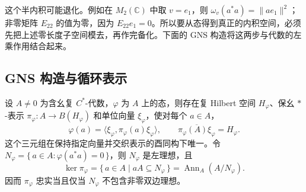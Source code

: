 \ProseParagraphBreak
这个半内积可能退化。例如在 \(M_2(\mathbb C)\) 中取 \(v=e_1\)，则 \(\omega_v(a^*a)=\|ae_1\|^2\)；非零矩阵 \(E_{22}\) 的值为零，因为 \(E_{22}e_1=0\)。所以要从态得到真正的内积空间，必须先把上述零长度子空间模去，再作完备化。下面的 GNS 构造将这两步与代数的左乘作用结合起来。

\subsection{GNS 构造与循环表示}
\label{b2:subsec:D03:02}

\begin{theorem}\label{b2:thm:gns-unital}
	设 \(A\ne0\) 为含幺复 \(C^*\)-代数，\(\varphi\) 为 \(A\) 上的态，则存在复 Hilbert 空间 \(H_\varphi\)、保幺 \(*\)-表示 \(\pi_\varphi:A\to B(H_\varphi)\) 和单位向量 \(\xi_\varphi\)，使对每个 \(a\in A\)，
	\[
		\varphi(a)=\bigl\langle\xi_\varphi,\pi_\varphi(a)\xi_\varphi\bigr\rangle, \qquad\overline{\pi_\varphi(A)\xi_\varphi}=H_\varphi.
	\]
	这个三元组在保持指定向量并交织表示的酉同构下唯一。令 \(N_\varphi=\{\,a\in A:\varphi(a^*a)=0\,\}\)，则 \(N_\varphi\) 是左理想，且
	\[
		\ker\pi_\varphi =\{\,a\in A\mid aA\subseteq N_\varphi\,\} =\operatorname{Ann}_A(A/N_\varphi).
	\]
	因而 \(\pi_\varphi\) 忠实当且仅当 \(N_\varphi\) 不包含非零双边理想。
\end{theorem}
